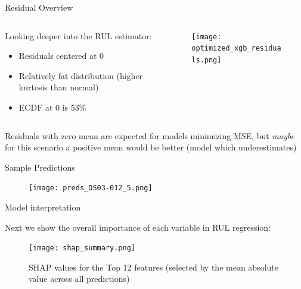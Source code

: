 \documentclass{beamer}
\begin{document}
        \begin{frame}{Residual Overview}
            \begin{columns}
                \begin{column}{0.45\textwidth}
                    Looking deeper into the RUL estimator:
                    \begin{itemize}
                        \item Residuals centered at 0
                        \item Relatively fat distribution (higher kurtosis than normal)
                        \item ECDF at 0 is 53\%
                    \end{itemize}
                \end{column}
                \begin{column}{0.55\textwidth}
                    \begin{figure}
                        \centering
                        \texttt{[image: optimized\_xgb\_residuals.png]}
                    \end{figure}
                \end{column}
            \end{columns}

            Residuals with zero mean are expected for models minimizing MSE, but \textit{maybe} for this scenario a positive mean would be better (model which underestimates)
        \end{frame}

        \begin{frame}{Sample Predictions}
            \begin{figure}[!htbp]
                \centering
                \texttt{[image: preds\_DS03-012\_5.png]}
            \end{figure}
        \end{frame}

        \begin{frame}{Model interpretation}

            Next we show the overall importance of each variable in RUL regression:
            \begin{figure}
                \centering
                \texttt{[image: shap\_summary.png]}
                \caption{SHAP values for the Top 12 features (selected by the mean absolute value across all predictions)}
            \end{figure}
        \end{frame}
\end{document}

